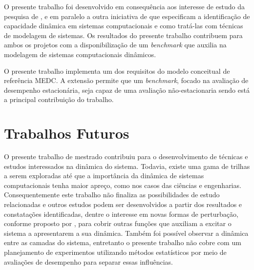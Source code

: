 O presente trabalho foi desenvolvido em consequência aos interesse de estudo da pesquisa de , e em paralelo a outra iniciativa de  que especificam a identificação de capacidade dinâmica em sistemas computacionais e como tratá-las com técnicas de modelagem de sistemas. Os resultados do presente trabalho contribuem para ambos os projetos com a disponibilização de um \textit{benchmark} que auxilia na modelagem de sistemas computacionais dinâmicos.

O presente trabalho implementa um dos requisitos do modelo conceitual de referência MEDC. A extensão permite que um \textit{benchmark}, focado na avaliação de desempenho estacionária, seja capaz de uma avaliação não-estacionaria sendo está a principal contribuição do trabalho.

\section{Trabalhos Futuros}
O presente trabalho de mestrado contribuiu para o desenvolvimento de técnicas e estudos interessados na dinâmica do sistema. Todavia, existe uma gama de trilhas a serem exploradas até que a importância da dinâmica de sistemas computacionais tenha maior apreço, como nos casos das ciências e engenharias. Consequentemente este trabalho não finaliza as possibilidades de estudo relacionadas e outros estudos podem ser desenvolvidos a partir dos resultados e constatações identificadas, dentre o interesse em novas formas de perturbação, conforme proposto por \cite{Hellerstein2004}, para cobrir outras funções que auxiliam a excitar o sistema a apresentarem a sua dinâmica. Também foi possível observar a dinâmica entre as camadas do sistema, entretanto o presente trabalho não cobre com um planejamento de experimentos utilizando métodos estatísticos por meio de avaliações de desempenho para separar essas influências.
